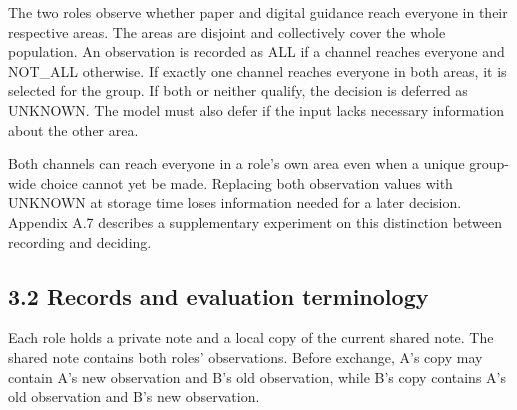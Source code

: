 \documentclass[10pt,a4paper]{article}
\begin{document}
The two roles observe whether paper and digital guidance reach everyone in their respective areas. The areas are disjoint and collectively cover the whole population. An observation is recorded as ALL if a channel reaches everyone and NOT\_ALL otherwise. If exactly one channel reaches everyone in both areas, it is selected for the group. If both or neither qualify, the decision is deferred as UNKNOWN. The model must also defer if the input lacks necessary information about the other area.

Both channels can reach everyone in a role's own area even when a unique group-wide choice cannot yet be made. Replacing both observation values with UNKNOWN at storage time loses information needed for a later decision. Appendix A.7 describes a supplementary experiment on this distinction between recording and deciding.

\subsection{3.2 Records and evaluation terminology}\label{paper-01-records-and-evaluation-terminology}

Each role holds a private note and a local copy of the current shared note. The shared note contains both roles' observations. Before exchange, A's copy may contain A's new observation and B's old observation, while B's copy contains A's old observation and B's new observation.
\end{document}

